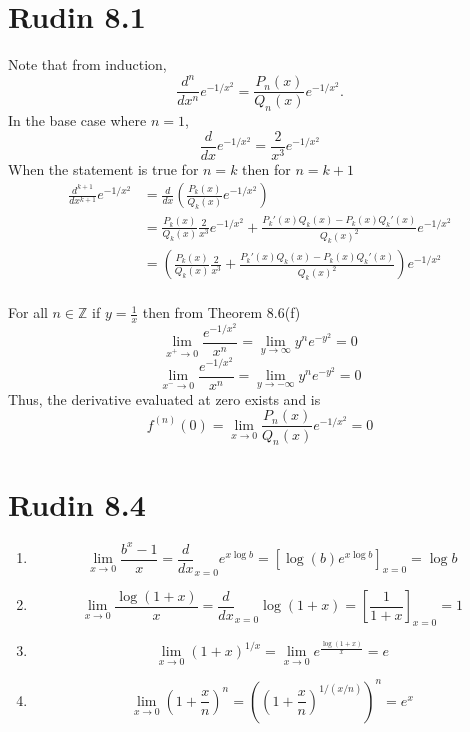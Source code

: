 \documentclass{article}
\begin{document}
\section*{Rudin 8.1}
Note that from induction,
\[
  \frac{d^n}{dx^n} e^{-1/x^2} = \frac{P_n(x)}{Q_n(x)} e^{-1/x^2}.
\]
In the base case where $n=1$,
\[
  \frac{d}{dx} e^{-1/x^2} = \frac{2}{x^3}e^{-1/x^2}
\]
When the statement is true for $n=k$ then for $n=k+1$
\begin{align*}
  \frac{d^{k+1}}{dx^{k+1}} e^{-1/x^2} 
  &= \frac{d}{dx} \left(\frac{P_k(x)}{Q_k(x)} e^{-1/x^2}\right) \\
  &= \frac{P_k(x)}{Q_k(x)} \frac{2}{x^3}e^{-1/x^2} + \frac{P_k'(x)Q_k(x) - P_k(x)Q_k'(x)}{Q_k(x)^2}e^{-1/x^2} \\
  &=\left( \frac{P_k(x)}{Q_k(x)} \frac{2}{x^3} + \frac{P_k'(x)Q_k(x) - P_k(x)Q_k'(x)}{Q_k(x)^2} \right)e^{-1/x^2} \\
\end{align*}


For all $n \in \mathbb{Z}$ if $y = \frac{1}{x}$ then from Theorem 8.6(f)
\[
  \lim_{x^+\to 0}\frac{e^{-1/x^2}}{x^n} 
  = \lim_{y\to \infty}y^ne^{-y^2}
  = 0
\]
\[
  \lim_{x^-\to 0}\frac{e^{-1/x^2}}{x^n} 
  = \lim_{y\to -\infty}y^ne^{-y^2}
  = 0
\]
Thus, the derivative evaluated at zero exists and is 
\[
  f^(n)(0) = \lim_{x\to 0} \frac{P_n(x)}{Q_n(x)} e^{-1/x^2} = 0
\]
\newpage 

\section*{Rudin 8.4}
\begin{enumerate}[label=(\alph*)]
  \item \[
    \lim_{x\to 0} \frac{b^x - 1}{x}
    = \frac{d}{dx}_{x=0} e^{x\log b}
    = [\log (b) e^{x\log b}]_{x=0}
    =\log b
  \]
  \item \[
    \lim_{x\to 0} \frac{\log(1+x)}{x}
    = \frac{d}{dx}_{x=0} \log(1+x)
    = \left[\frac{1}{1+x}\right]_{x=0}
    = 1
  \]
  \item \[
    \lim_{x\to 0} (1+x)^{1/x}
    = \lim_{x\to 0} e^\frac{\log(1+x)}{x}
    = e
  \]
  \item \[
    \lim_{x\to 0} \left(1+\frac{x}{n}\right)^n 
    = \left(\left(1 + \frac{x}{n}\right)^{1/(x/n)}\right)^n
    = e^x
  \]
\end{enumerate}
\newpage 
\end{document}
